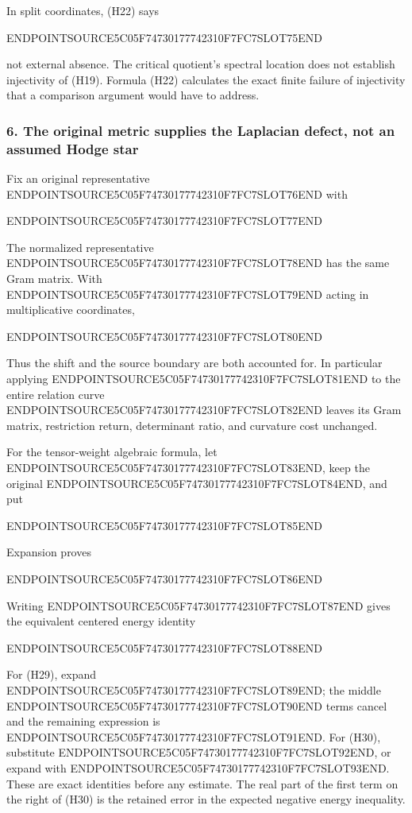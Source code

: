 In split coordinates, (H22) says

ENDPOINTSOURCE5C05F74730177742310F7FC7SLOT75END

not external absence. The critical quotient's spectral location does not establish injectivity of (H19). Formula (H22) calculates the exact finite failure of injectivity that a comparison argument would have to address.

\subsubsection{6. The original metric supplies the Laplacian defect, not an assumed Hodge star}\label{endpoint-cc_hochschild--the-original-metric-supplies-the-laplacian-defect-not-an-assumed-hodge-star}

Fix an original representative ENDPOINTSOURCE5C05F74730177742310F7FC7SLOT76END with

ENDPOINTSOURCE5C05F74730177742310F7FC7SLOT77END

The normalized representative ENDPOINTSOURCE5C05F74730177742310F7FC7SLOT78END has the same Gram matrix. With ENDPOINTSOURCE5C05F74730177742310F7FC7SLOT79END acting in multiplicative coordinates,

ENDPOINTSOURCE5C05F74730177742310F7FC7SLOT80END

Thus the shift and the source boundary are both accounted for. In particular applying ENDPOINTSOURCE5C05F74730177742310F7FC7SLOT81END to the entire relation curve ENDPOINTSOURCE5C05F74730177742310F7FC7SLOT82END leaves its Gram matrix, restriction return, determinant ratio, and curvature cost unchanged.

For the tensor-weight algebraic formula, let ENDPOINTSOURCE5C05F74730177742310F7FC7SLOT83END, keep the original ENDPOINTSOURCE5C05F74730177742310F7FC7SLOT84END, and put

ENDPOINTSOURCE5C05F74730177742310F7FC7SLOT85END

Expansion proves

ENDPOINTSOURCE5C05F74730177742310F7FC7SLOT86END

Writing ENDPOINTSOURCE5C05F74730177742310F7FC7SLOT87END gives the equivalent centered energy identity

ENDPOINTSOURCE5C05F74730177742310F7FC7SLOT88END

For (H29), expand ENDPOINTSOURCE5C05F74730177742310F7FC7SLOT89END; the middle ENDPOINTSOURCE5C05F74730177742310F7FC7SLOT90END terms cancel and the remaining expression is ENDPOINTSOURCE5C05F74730177742310F7FC7SLOT91END. For (H30), substitute ENDPOINTSOURCE5C05F74730177742310F7FC7SLOT92END, or expand with ENDPOINTSOURCE5C05F74730177742310F7FC7SLOT93END. These are exact identities before any estimate. The real part of the first term on the right of (H30) is the retained error in the expected negative energy inequality.

